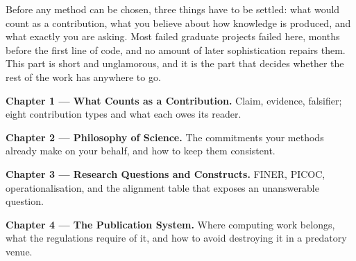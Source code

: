 
Before any method can be chosen, three things have to be settled: what
would count as a contribution, what you believe about how knowledge is
produced, and what exactly you are asking. Most failed graduate projects failed
here, months before the first line of code, and no amount of later
sophistication repairs them. This part is short and unglamorous, and it is the
part that decides whether the rest of the work has anywhere to go.

\begin{conceptbox}
\begin{tight}
  \item \textbf{Chapter 1 --- What Counts as a Contribution.} Claim, evidence, falsifier; eight contribution types and what each owes its reader.
  \item \textbf{Chapter 2 --- Philosophy of Science.} The commitments your methods already make on your behalf, and how to keep them consistent.
  \item \textbf{Chapter 3 --- Research Questions and Constructs.} FINER, PICOC, operationalisation, and the alignment table that exposes an unanswerable question.
  \item \textbf{Chapter 4 --- The Publication System.} Where computing work belongs, what the regulations require of it, and how to avoid destroying it in a predatory venue.
\end{tight}
\end{conceptbox}
